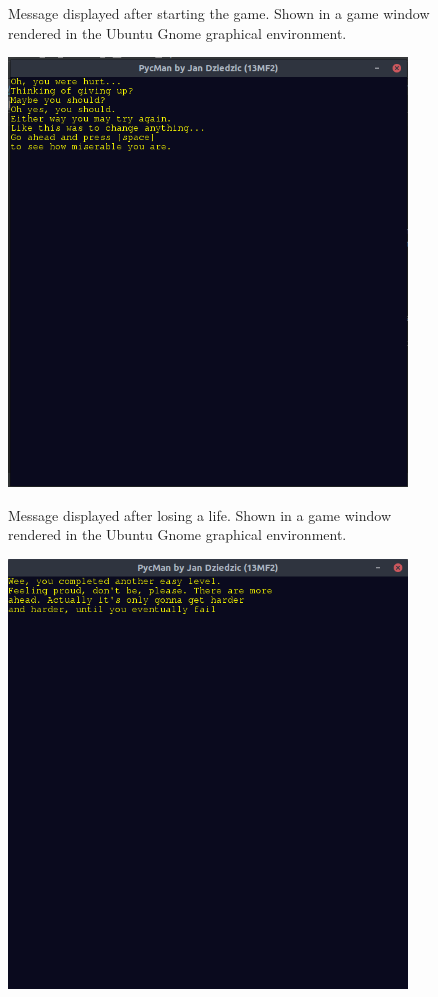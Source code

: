 \documentclass[11pt,a4paper,notitlepage]{report}
\newenvironment{img}{
	\begin{center}
		\begin{figure}[H]
			\begin{center}
			
}{
	\end{center}
		\end{figure}
			\end{center}
}
\begin{document}
\begin{center}
\begin{img}
					\caption{Message displayed after starting the game. Shown in a game window rendered in the Ubuntu Gnome graphical environment.}
				\end{img}
				\begin{img}
					\includegraphics[width=300pt]{images/loss_of_life_msg.png}\\
					\caption{Message displayed after losing a life. Shown in a game window rendered in the Ubuntu Gnome graphical environment.}
				\end{img}
				\begin{img}
					\includegraphics[width=300pt]{images/level-complete.png}\\

\end{img}
\end{center}
\end{document}

